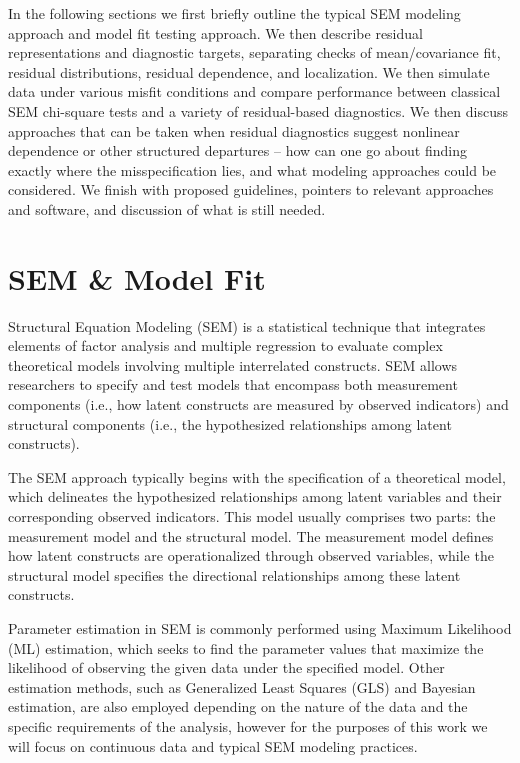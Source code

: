 \documentclass[floatsintext,a4paper]{apa7} %
\begin{document}
	In the following sections we first briefly outline the typical SEM modeling approach and model fit testing approach. We then describe residual representations and diagnostic targets, separating checks of mean/covariance fit, residual distributions, residual dependence, and localization. We then simulate data under various misfit conditions and compare performance between classical SEM chi-square tests and a variety of residual-based diagnostics. We then discuss approaches that can be taken when residual diagnostics suggest nonlinear dependence or other structured departures -- how can one go about finding exactly where the misspecification lies, and what modeling approaches could be considered. We finish with proposed guidelines, pointers to relevant approaches and software, and discussion of what is still needed.
	
	\section{SEM \& Model Fit}
	
	Structural Equation Modeling (SEM) is a statistical technique that integrates elements of factor analysis and multiple regression to evaluate complex theoretical models involving multiple interrelated constructs. SEM allows researchers to specify and test models that encompass both measurement components (i.e., how latent constructs are measured by observed indicators) and structural components (i.e., the hypothesized relationships among latent constructs).
	
	The SEM approach typically begins with the specification of a theoretical model, which delineates the hypothesized relationships among latent variables and their corresponding observed indicators. This model usually comprises two parts: the measurement model and the structural model. The measurement model defines how latent constructs are operationalized through observed variables, while the structural model specifies the directional relationships among these latent constructs.
	
	Parameter estimation in SEM is commonly performed using Maximum Likelihood (ML) estimation, which seeks to find the parameter values that maximize the likelihood of observing the given data under the specified model. Other estimation methods, such as Generalized Least Squares (GLS) and Bayesian estimation, are also employed depending on the nature of the data and the specific requirements of the analysis, however for the purposes of this work we will focus on continuous data and typical SEM modeling practices.
	
\end{document}
